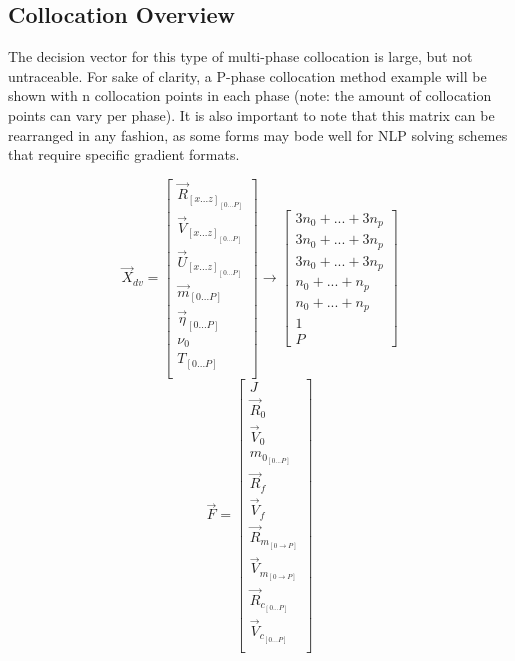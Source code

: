 \subsection{Collocation Overview}
The decision vector for this type of multi-phase collocation is large, but not untraceable. For sake of clarity, a P-phase collocation method example will be shown with n collocation points in each phase (note: the amount of collocation points can vary per phase). It is also important to note that this matrix can be rearranged in any fashion, as some forms may bode well for NLP solving schemes that require specific gradient formats.
\begin{multicols}{2}
\begin{equation}
\vec{X}_{dv} = 
\begin{bmatrix}
\vec{R}_{[x ... z]_{[0 ... P]}} \\
\vec{V}_{[x ... z]_{[0 ... P]}} \\
\vec{U}_{[x ... z]_{[0 ... P]}} \\
\vec{m}_{[0 ... P]} \\
\vec{\eta }_{[0 ... P]} \\
\nu_0 \\
T_{[0 ... P]} \\
\end{bmatrix}
\rightarrow
\begin{bmatrix}
3 n_0 + ... + 3 n_p \\
3 n_0 + ... + 3 n_p \\
3 n_0 + ... + 3 n_p \\
n_0 + ... + n_p \\
n_0 + ... + n_p \\
1 \\
P 
\end{bmatrix}
\end{equation} 
\break
\begin{equation}
\vec{F} = 
\begin{bmatrix}
J \\
\vec{R}_0 \\
\vec{V}_0 \\
m_{0_{[0 ... P]}} \\
\vec{R}_f \\
\vec{V}_f \\
\vec{R}_{m_{[0 \rightarrow P]}} \\
\vec{V}_{m_{[0 \rightarrow P]}} \\
\vec{R}_{c_{[0 ... P]}} \\
\vec{V}_{c_{[0 ... P]}} \\

\end{bmatrix}
\end{equation}
\end{multicols}
